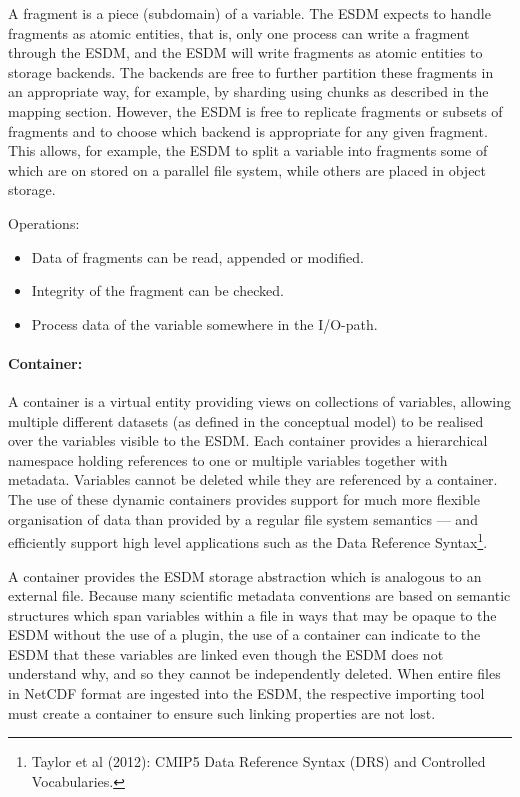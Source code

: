 A fragment is a piece (subdomain) of a variable. The ESDM expects to
handle fragments as atomic entities, that is, only one process can write
a fragment through the ESDM, and the ESDM will write fragments as atomic
entities to storage backends. The backends are free to further partition
these fragments in an appropriate way, for example, by sharding using
chunks as described in the mapping section. However, the ESDM is free to
replicate fragments or subsets of fragments and to choose which backend
is appropriate for any given fragment. This allows, for example, the
ESDM to split a variable into fragments some of which are on stored on a
parallel file system, while others are placed in object storage.

Operations:

\begin{itemize}
  \item Data of fragments can be read, appended or modified.
  \item Integrity of the fragment can be checked.
  \item Process data of the variable somewhere in the I/O-path.
\end{itemize}

\paragraph{Container:}%
\label{container}

A container is a virtual entity providing views on collections of
variables, allowing multiple different datasets (as defined in the
conceptual model) to be realised over the variables visible to the ESDM.
Each container provides a hierarchical namespace holding references to
one or multiple variables together with metadata. Variables cannot be
deleted while they are referenced by a container. The use of these
dynamic containers provides support for much more flexible organisation
of data than provided by a regular file system semantics --- and
efficiently support high level applications such as the Data Reference
Syntax\footnote{Taylor et al (2012): CMIP5 Data Reference Syntax (DRS) and Controlled Vocabularies.}.

A container provides the ESDM storage abstraction which is analogous to
an external file. Because many scientific metadata conventions are based
on semantic structures which span variables within a file in ways that
may be opaque to the ESDM without the use of a plugin, the use of a
container can indicate to the ESDM that these variables are linked even
though the ESDM does not understand why, and so they cannot be
independently deleted. When entire files in NetCDF format are ingested
into the ESDM, the respective importing tool must create a container to
ensure such linking properties are not lost.

